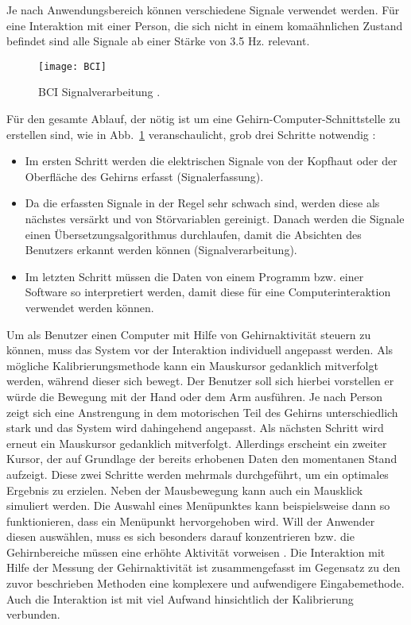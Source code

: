 \vspace{\baselineskip}
Je nach Anwendungsbereich können verschiedene Signale verwendet werden. Für eine Interaktion mit einer Person, die sich nicht in einem komaähnlichen Zustand befindet sind alle Signale ab einer Stärke von 3.5 Hz. relevant.
\newline \newline
%
%
\begin{figure}
\centering
\texttt{[image: BCI]}
\caption{BCI Signalverarbeitung \cite{BRAIN}.}
\label{fig:BCI}
\end{figure}
%
%
Für den gesamte Ablauf, der nötig ist um eine Gehirn-Computer-Schnittstelle zu erstellen sind, wie in Abb.~\ref{fig:BCI} veranschaulicht, grob drei Schritte notwendig \cite{BRAIN}:
\begin{itemize}
      \item Im ersten Schritt werden die elektrischen Signale von der Kopfhaut oder der Oberfläche des Gehirns erfasst (Signalerfassung).
      \item Da die erfassten Signale in der Regel sehr schwach sind, werden diese als nächstes versärkt und von Störvariablen gereinigt. Danach werden die Signale einen Übersetzungsalgorithmus durchlaufen, damit die Absichten des Benutzers erkannt werden können (Signalverarbeitung).
			\item Im letzten Schritt müssen die Daten von einem Programm bzw. einer Software so interpretiert werden, damit diese für eine Computerinteraktion verwendet werden können.
\end{itemize}
%
%
\vspace{\baselineskip}
Um als Benutzer einen Computer mit Hilfe von Gehirnaktivität steuern zu können, muss das System vor der Interaktion individuell angepasst werden. Als mögliche Kalibrierungsmethode kann ein Mauskursor gedanklich mitverfolgt werden, während dieser sich bewegt. Der Benutzer soll sich hierbei vorstellen er würde die Bewegung mit der Hand oder dem Arm ausführen. Je nach Person zeigt sich eine Anstrengung in dem motorischen Teil des Gehirns unterschiedlich stark und das System wird dahingehend angepasst. Als nächsten Schritt wird erneut ein Mauskursor gedanklich mitverfolgt. Allerdings erscheint ein zweiter Kursor, der auf Grundlage der bereits erhobenen Daten den momentanen Stand aufzeigt. Diese zwei Schritte werden mehrmals durchgeführt, um ein optimales Ergebnis zu erzielen. Neben der Mausbewegung kann auch ein Mausklick simuliert werden. Die Auswahl eines Menüpunktes kann beispielsweise dann so funktionieren, dass ein Menüpunkt hervorgehoben wird. Will der Anwender diesen auswählen, muss es sich besonders darauf konzentrieren bzw. die Gehirnbereiche müssen eine erhöhte Aktivität vorweisen \cite{BrainInt}.
\newline \newline
Die Interaktion mit Hilfe der Messung der Gehirnaktivität ist zusammengefasst im Gegensatz zu den zuvor beschrieben Methoden eine komplexere und aufwendigere Eingabemethode. Auch die Interaktion ist mit viel Aufwand hinsichtlich der Kalibrierung verbunden.
